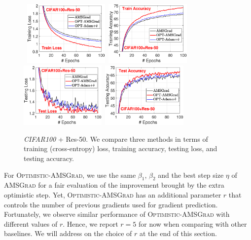 \documentclass[11pt]{article}
\theoremstyle{k}
\begin{document}
\begin{figure}[h]
\begin{center}
\mbox{
\includegraphics[width=1.65in]{new_figure/cifar100_train_loss_disz.eps}\hspace{-0.1in}
\includegraphics[width=1.65in]{new_figure/cifar100_train_acc_disz.eps}
}
\mbox{
\includegraphics[width=1.65in]{new_figure/cifar100_test_loss_disz.eps}\hspace{-0.1in}
\includegraphics[width=1.65in]{new_figure/cifar100_test_acc_disz.eps}
}
\end{center}
\caption{\textit{CIFAR100} + Res-50. We compare three methods in terms of training (cross-entropy) loss, training accuracy, testing loss, and testing accuracy.} \label{figs:CIFAR100_new3}
\end{figure}

For \textsc{Optimistic-AMSGrad}, we use the same $\beta_1$, $\beta_2$ and 
the best step size $\eta$ of \textsc{AMSGrad} for a fair evaluation of the improvement brought by the extra optimistic step. Yet,
\textsc{Optimistic-AMSGrad} has an additional parameter $r$ that controls the number of previous gradients used for gradient prediction. Fortunately, we observe similar performance of \textsc{Optimistic-AMSGrad} with different values of $r$. Hence, we report $r=5$ for now when comparing with other baselines. We will address on the choice of $r$ at the end of this section.
\end{document}
